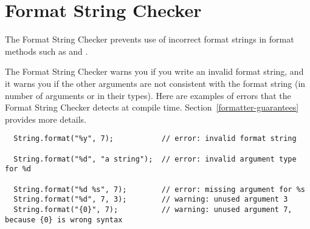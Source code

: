 \htmlhr
\chapter{Format String Checker\label{formatter-checker}}

\begin{sloppypar}
The Format String Checker
prevents use of incorrect format strings
in format methods such as
and .
\end{sloppypar}

The Format String Checker warns you if you write an invalid format string,
and it warns you if the other arguments are not consistent with the format
string (in number of arguments or in their types).
Here are examples of errors that the
Format String Checker
detects at compile time.
Section~\ref{formatter-guarantees} provides more details.



%
%

\begin{Verbatim}
  String.format("%y", 7);           // error: invalid format string

  String.format("%d", "a string");  // error: invalid argument type for %d

  String.format("%d %s", 7);        // error: missing argument for %s
  String.format("%d", 7, 3);        // warning: unused argument 3
  String.format("{0}", 7);          // warning: unused argument 7, because {0} is wrong syntax
\end{Verbatim}


